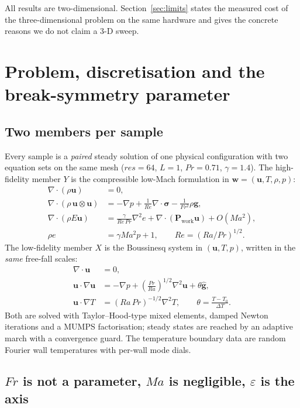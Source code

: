 \documentclass[11pt,a4paper]{article}
\begin{document}
All results are two-dimensional. Section~\ref{sec:limits} states the measured cost of the
three-dimensional problem on the same hardware and gives the concrete reasons we do not claim a 3-D
sweep.
\section{Problem, discretisation and the break-symmetry parameter}
\label{sec:problem}

\subsection{Two members per sample}
\label{sec:pair}

Every sample is a \emph{paired} steady solution of one physical configuration with two equation sets
on the same mesh ($res=64$, $L=1$, $Pr=0.71$, $\gamma=1.4$). The high-fidelity member $Y$ is the
compressible low-Mach formulation in $\bm w=(\bm u,T,\rho,p)$:
\begin{align}
\nabla\cdot(\rho\bm u)&=0,\label{eq:cmass}\\
\nabla\cdot(\rho\,\bm u\otimes\bm u)&=-\nabla p+\frac{1}{Re}\nabla\cdot\bm\sigma-\frac{1}{Fr^2}\rho\bm g,\label{eq:cmom}\\
\nabla\cdot(\rho E\bm u)&=\frac{\gamma}{Re\,Pr}\nabla^2e+\nabla\cdot(\bm P_{\mathrm{work}}\bm u)+O(Ma^2),\label{eq:cenergy}\\
\rho e&=\gamma Ma^2p+1,\qquad Re=(Ra/Pr)^{1/2}.\label{eq:ceos}
\end{align}
The low-fidelity member $X$ is the Boussinesq system in $(\bm u,T,p)$, written in the \emph{same}
free-fall scales:
\begin{align}
\nabla\cdot\bm u&=0,\label{eq:bmass}\\
\bm u\cdot\nabla\bm u&=-\nabla p+\left(\frac{Pr}{Ra}\right)^{1/2}\nabla^2\bm u+\theta\hat{\bm g},\label{eq:bmom}\\
\bm u\cdot\nabla T&=(Ra\,Pr)^{-1/2}\nabla^2T,\qquad \theta=\frac{T-T_0}{\Delta T}.\label{eq:benergy}
\end{align}
Both are solved with Taylor--Hood-type mixed elements, damped Newton iterations and a MUMPS
factorisation; steady states are reached by an adaptive march with a convergence guard. The
temperature boundary data are random Fourier wall temperatures with per-wall mode dials.

\subsection{$Fr$ is not a parameter, $Ma$ is negligible, $\varepsilon$ is the axis}
\label{sec:axis}
\end{document}
